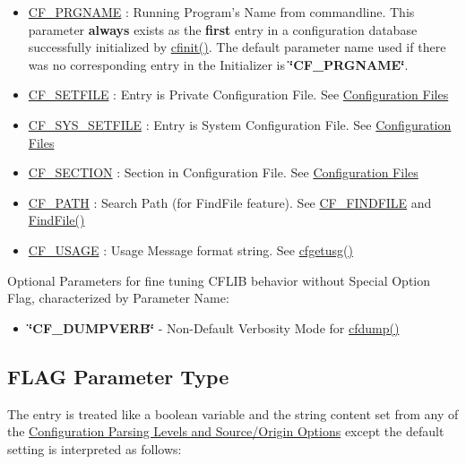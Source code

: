 \begin{itemize}
\item \hyperlink{group__special__options__mask_g071c29b5177f2df2400712ce8daae9b0}{CF\_\-PRGNAME} : Running Program's Name from commandline.  This parameter {\bf always} exists as the {\bf first} entry in a configuration database successfully initialized by \hyperlink{group__cflib__core_ge593ff607f853bd5fc16a16bb6759314}{cfinit()}. The default parameter name used if there was no corresponding entry in the Initializer is {\bf \char`\"{}CF\_\-PRGNAME\char`\"{}}.\item \hyperlink{group__special__options__mask_gfeeb63d4d8c498bec4a237ad8b94f02f}{CF\_\-SETFILE} : Entry is Private Configuration File.  See \hyperlink{config_files}{Configuration Files}\item \hyperlink{group__special__options__mask_gbb03ea68e07e388da2c1337a1582c72e}{CF\_\-SYS\_\-SETFILE} : Entry is System Configuration File.  See \hyperlink{config_files}{Configuration Files}\item \hyperlink{group__special__options__mask_g603f0467f101b71f5f869381429ffef4}{CF\_\-SECTION} : Section in Configuration File.  See \hyperlink{config_files}{Configuration Files}\item \hyperlink{group__special__options__mask_gb383c1436888ea6b410141f7c0b1f306}{CF\_\-PATH} : Search Path (for FindFile feature).  See \hyperlink{group__special__options__mask_g675b6f8440beecc09fec54d17e9c3ee9}{CF\_\-FINDFILE} and \hyperlink{group__utilities_g4e4e8f9a03b7f3598b5efd199b9a67c9}{FindFile()}\item \hyperlink{group__special__options__mask_gc30981201d7455071cef38a0133b9228}{CF\_\-USAGE} : Usage Message format string.  See \hyperlink{group__retrieval_ge272c1881db940e56c8cc364df730271}{cfgetusg()}\end{itemize}


Optional Parameters for fine tuning CFLIB behavior without Special Option Flag, characterized by Parameter Name:

\begin{itemize}
\item {\bf \char`\"{}CF\_\-DUMPVERB\char`\"{}} - Non-Default Verbosity Mode for \hyperlink{group__advanced__features_gecfc8ee37366e1b36cb5aac0cc41ebdc}{cfdump()}\end{itemize}
\hypertarget{parameter_types_parameter_type_flag}{}\subsection{FLAG Parameter Type}\label{parameter_types_parameter_type_flag}
The entry is treated like a boolean variable and the string content set from any of the \hyperlink{config_levels}{Configuration Parsing Levels and Source/Origin Options} except the default setting is interpreted as follows:

